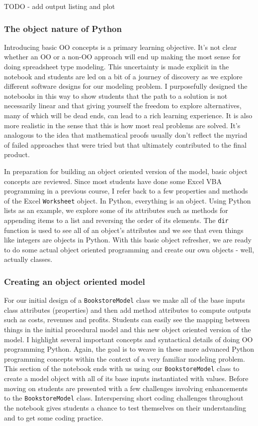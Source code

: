 \documentclass[ited,blindrev]{informs3}              %
\newcommand{\code}[1]{\texttt{#1}}
\begin{document}
TODO - add output listing and plot

\subsubsection{The object nature of Python}

Introducing basic OO concepts is a primary learning objective. It's not clear whether an OO or a non-OO approach will end up making the most sense for doing spreadsheet type modeling. This uncertainty is made explicit in the notebook and students are led on a bit of a journey of discovery as we explore different software designs for our modeling problem. I purposefully designed the notebooks in this way to show students that the path to a solution is not necessarily linear and that giving yourself the freedom to explore alternatives, many of which will be dead ends, can lead to a rich learning experience. It is also more realistic in the sense that this is how most real problems are solved. It's analogous to the idea that mathematical proofs usually don't reflect the myriad of failed approaches that were tried but that ultimately contributed to the final product.

In preparation for building an object oriented version of the model, basic object concepts are reviewed. Since most students have done some Excel VBA programming in a previous course, I refer back to a few properties and methods of the Excel \code{Worksheet} object. In Python, everything is an object. Using Python lists as an example, we explore some of its attributes such as methods for appending items to a list and reversing the order of its elements. The \code{dir} function is used to see all of an object's attributes and we see that even things like integers are objects in Python. With this basic object refresher, we are ready to do some actual object oriented programming and create our own objects - well, actually classes.

\subsubsection{Creating an object oriented model}

For our initial design of a \code{BookstoreModel} class we make all of the base inputs class attributes (properties) and then add method attributes to compute outputs such as costs, revenues and profits. Students can easily see the mapping between things in the initial procedural model and this new object oriented version of the model. I highlight several important concepts and syntactical details of doing OO programming Python. Again, the goal is to weave in these more advanced Python programming concepts within the context of a very familiar modeling problem. This section of the notebook ends with us using our \code{BookstoreModel} class to create a model object with all of its base inputs instantiated with values. Before moving on students are presented with a few challenges involving enhancements to the \code{BookstoreModel} class. Interspersing short coding challenges throughout the notebook gives students a chance to test themselves on their understanding and to get some coding practice.
\end{document}
